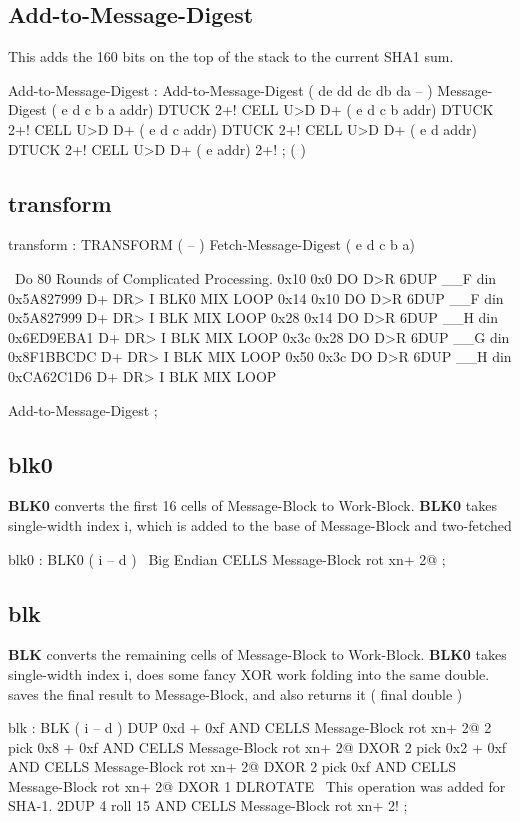 \subsection{Add-to-Message-Digest}
This adds the 160 bits on the top of the stack to the current SHA1 sum.
\begin{chunk}{Add-to-Message-Digest}
    : Add-to-Message-Digest  ( de dd dc db da -- )
        Message-Digest                 ( e d c b a addr)
            DTUCK 2+! CELL U>D D+      ( e d c b addr)
            DTUCK 2+! CELL U>D D+      ( e d c addr)
            DTUCK 2+! CELL U>D D+      ( e d addr)
            DTUCK 2+! CELL U>D D+      ( e addr)
                 2+! ;                 ( )

\end{chunk}

\subsection{transform}
\begin{chunk}{transform}
: TRANSFORM         ( -- )
    Fetch-Message-Digest    ( e d c b a)

    \  Do 80 Rounds of Complicated Processing.
    0x10  0x0 DO  D>R  6DUP __F din 0x5A827999 D+  DR>  I BLK0  MIX  LOOP
    0x14 0x10 DO  D>R  6DUP __F din 0x5A827999 D+  DR>  I BLK   MIX  LOOP
    0x28 0x14 DO  D>R  6DUP __H din 0x6ED9EBA1 D+  DR>  I BLK   MIX  LOOP
    0x3c 0x28 DO  D>R  6DUP __G din 0x8F1BBCDC D+  DR>  I BLK   MIX  LOOP
    0x50 0x3c DO  D>R  6DUP __H din 0xCA62C1D6 D+  DR>  I BLK   MIX  LOOP

    Add-to-Message-Digest ;

\end{chunk}

\subsection{blk0}
{\bf BLK0} converts the first 16 cells of Message-Block to Work-Block.
{\bf BLK0} takes single-width index i,
which is added to the base of Message-Block and two-fetched
\begin{chunk}{blk0}
: BLK0              ( i -- d )     \  Big Endian
    CELLS Message-Block rot xn+ 2@ ;

\end{chunk}

\subsection{blk}
{\bf BLK} converts the remaining cells of Message-Block to Work-Block. 
{\bf BLK0} takes single-width index i, does some fancy XOR work folding
into the same double. saves the final result to Message-Block,
and also returns it ( final double )
\begin{chunk}{blk}
: BLK               ( i -- d )
    DUP  0xd + 0xf AND CELLS Message-Block rot xn+ 2@
    2 pick 0x8 + 0xf AND CELLS Message-Block rot xn+ 2@  DXOR
    2 pick 0x2 + 0xf AND CELLS Message-Block rot xn+ 2@  DXOR
    2 pick       0xf AND CELLS Message-Block rot xn+ 2@  DXOR
    1 DLROTATE  \  This operation was added for SHA-1.
    2DUP 4 roll 15 AND CELLS Message-Block rot xn+ 2! ;
\end{chunk}


